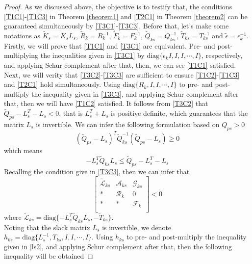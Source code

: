 \documentclass[conference]{IEEEtran}
\begin{document}
\begin{proof}
	As we discussed above, the objective is to testify that, the conditions \eqref{T1C1}-\eqref{T1C3} in Theorem \ref{theorem1} and \eqref{T2C1} in Theorem \ref{theorem2}  can be guaranteed simultaneously by \eqref{T3C1}-\eqref{T3C3}. Before that, let's make some notations as $\tilde{K}_{s}=K_{s}L_{s}$, $\tilde{R}_{k}=R^{-1}_{k}$, $\tilde{F}_{k}=F^{-1}_{k}$, $\tilde{Q}_{ks}=Q^{-1}_{ks}$, $\tilde{T}_{ks}=T^{-1}_{ks}$ and  $\tilde{\epsilon}=\epsilon^{-1}_{k}$. 
	Firstly, we will prove that \eqref{T1C1} and \eqref{T3C1} are equivalent. Pre- and post- multiplying the inequalities given in \eqref{T3C1} by $\mathrm{diag}\{\epsilon_{k}I, I,I,\cdots,I \}$, respectively, and applying  Schur complement after that, then, we can see \eqref{T1C1} satisfied.  
	Next, we will verity that \eqref{T3C2}-\eqref{T3C3} are sufficient  to ensure \eqref{T1C2}-\eqref{T1C3} and \eqref{T2C1} hold simultaneously.  Using $\mathrm{diag}\{R_{k}, I ,I,\cdots, I \}$  to pre- and post-multiply the inequality given in \eqref{T3C3}, and applying Schur complement after that, then we will have \eqref{T1C2} satisfied.  
	It follows from  \eqref{T3C2} that $\tilde{Q}_{ps}-L^{T}_{s}-L_{s}<0$, that is $L^{T}_{s}+L_{s} $ is positive definite, which guarantees that the matrix  $L_{s}$ is invertible. We can infer the following formulation based on $Q_{ps}>0$
	\begin{equation}
		(\tilde{Q}_{ps} - L_{s} )^{T}\tilde{Q}^{-1}_{ks}(\tilde{Q}_{ps} - L_{s} )\geq 0
	\end{equation}
	which means 
	\begin{equation}
		-L^{T}_{s}\tilde{Q}_{ks}L_{s} \leq  \tilde{Q}_{ps}-L^{T}_{s}-L_{s}
	\end{equation}
	Recalling the condition give in \eqref{T3C3}, then we can infer that
	 \begin{equation} \label{ls2}
	 	\begin{bmatrix}
	 	\tilde{\mathscr{L}}_{ks}&\mathscr{A}_{ks}&\mathscr{G}_{ks}\\
	 	*&\mathscr{R}_{k}&0\\
	 	*&*&\mathscr{F}_{k}\\
	 	\end{bmatrix}<0
	 \end{equation}
	 where $\tilde{\mathscr{L}}_{ks}= \mathrm{diag}\{-L^{T}_{s}\tilde{Q}_{ks}L_{s},  -\tilde{T}_{ks} \}$. \\
	 Noting that the slack matrix $L_{s}$ is invertible, we denote $h_{ks}= \mathrm{diag}\{L^{-1}_{s}, T_{ks}, I, I,\cdots, I \}$. Using $h_{ks}$ to  pre- and post-multiply the inequality given in \eqref{ls2}, and applying Schur complement after that, then the following inequality will be obtained

\end{proof}
\end{document}
